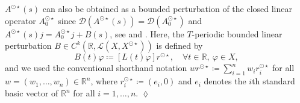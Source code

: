 \documentclass[english]{myarticle}
\begin{document}
\begin{sloppypar}
\begin{remark} \label{remark:DDEperturbation}
$A^{\odot \star}(s)$ can also be obtained as a bounded perturbation of the closed linear operator $A_0^{\odot \star}$ since $\mathcal{D}(A^{\odot \star}(s)) = \mathcal{D}(A_0^{\odot \star})$ and $A^{\odot \star}(s)j = A_0^{\odot \star}j + B(s)$, see \cite[Chapter II and III]{Diekmann1995} and \cite[Section 2]{Article2}. Here, the $T$-periodic bounded linear perturbation $B \in C^k(\mathbb{R},\mathcal{L}(X,X^{\odot \star}))$ is defined by
\begin{equation} \label{eq:perturbationB}
    B(t)\varphi \coloneqq [L(t)\varphi]r^{\odot \star}, \quad \forall t \in \mathbb{R}, \ \varphi \in X,
\end{equation}
and we used the conventional shorthand notation $wr^{\odot \star} \coloneqq \sum_{i = 1}^{n} w_ir_i^{\odot \star}$ for all $w = (w_1,\dots,w_n) \in \mathbb{R}^{n}$, where $r_i^{\odot \star} \coloneqq (e_i,0)$ and $e_i$ denotes the $i$th standard basic vector of $\mathbb{R}^n$ for all $i = 1,\dots,n$. \hfill $\lozenge$
\end{remark}


\end{sloppypar}
\end{document}

